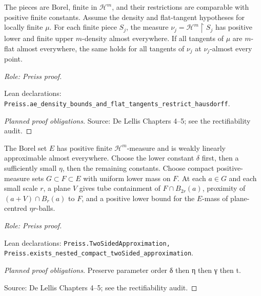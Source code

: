 \begin{lemma}
\label{lem:finite-piece-transfer}







The pieces are Borel, finite in \(\mathcal H^m\), and their restrictions are comparable with positive finite constants. Assume the density and flat-tangent hypotheses for locally finite \(\mu\).
For each finite piece \(S_j\), the measure \(\nu_j=\mathcal H^m\!\restriction S_j\) has positive lower and finite upper \(m\)-density almost everywhere. If all tangents of \(\mu\) are \(m\)-flat almost everywhere, the same holds for all tangents of \(\nu_j\) at \(\nu_j\)-almost every point.
\par\emph{Role: Preiss proof.}
\par Lean declarations: \texttt{Preiss.ae\_density\_bounds\_and\_flat\_tangents\_restrict\_hausdorff}.
\end{lemma}
\begin{proof}[Planned proof obligations]

\par Source: De Lellis Chapters 4--5; see the rectifiability audit.
\end{proof}

\begin{lemma}
\label{lem:nested-compact-approximation}







The Borel set \(E\) has positive finite \(\mathcal H^m\)-measure and is weakly linearly approximable almost everywhere. Choose the lower constant \(\delta\) first, then a sufficiently small \(\eta\), then the remaining constants.
Choose compact positive-measure sets \(G\subset F\subset E\) with uniform lower mass on \(F\). At each \(a\in G\) and each small scale \(r\), a plane \(V\) gives tube containment of \(F\cap B_{2r}(a)\), proximity of \((a+V)\cap B_r(a)\) to \(F\), and a positive lower bound for the \(E\)-mass of plane-centred \(\eta r\)-balls.
\par\emph{Role: Preiss proof.}
\par Lean declarations: \texttt{Preiss.TwoSidedApproximation, Preiss.exists\_nested\_compact\_twoSided\_approximation}.
\end{lemma}
\begin{proof}[Planned proof obligations]

Preserve parameter order δ then η then γ then t.
\par Source: De Lellis Chapters 4--5; see the rectifiability audit.
\end{proof}

